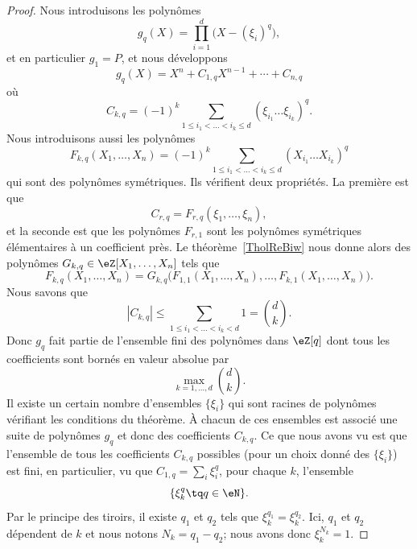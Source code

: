 \begin{proof}
    Nous introduisons les polynômes
    \begin{equation}
        g_q(X)=\prod_{i=1}^d\big( X-(\xi_i)^q \big),
    \end{equation}
    et en particulier \( g_1=P\), et nous développons
    \begin{equation}
        g_q(X)=X^n+C_{1,q}X^{n-1}+\cdots +C_{n,q}
    \end{equation}
    où
    \begin{equation}
        C_{k,q}=(-1)^k\sum_{1\leq i_1<\ldots<i_k\leq d}(\xi_{i_1}\ldots \xi_{i_k})^q.
    \end{equation}
    Nous introduisons aussi les polynômes
    \begin{equation}
        F_{k,q}(X_1,\ldots, X_n)=(-1)^k\sum_{1\leq i_1<\ldots< i_k\leq d}(X_{i_1}\ldots X_{i_k})^q
    \end{equation}
    qui sont des polynômes symétriques. Ils vérifient deux propriétés. La première est que
    \begin{equation}
        C_{r,q}=F_{r,q}(\xi_1,\ldots, \xi_n),
    \end{equation}
    et la seconde est que les polynômes \( F_{r,1}\) sont les polynômes symétriques élémentaires à un coefficient près. Le théorème~\ref{TholReBiw} nous donne alors des polynômes \( G_{k,q}\in \eZ[X_1,\ldots, X_n]\) tels que
    \begin{equation}
        F_{k,q}(X_1,\ldots, X_n)=G_{k,q}\big( F_{1,1}(X_1,\ldots, X_n),\ldots, F_{k,1}(X_1,\ldots, X_n) \big).
    \end{equation}
    Nous savons que
    \begin{equation}
        | C_{k,q} |\leq \sum_{1\leq i_1<\ldots<i_k<d}1={d\choose k}.
    \end{equation}
    Donc \( g_q\) fait partie de l'ensemble fini des polynômes dans \( \eZ[q]\) dont tous les coefficients sont bornés en valeur absolue par
    \begin{equation}
        \max_{k=1,\ldots, d}{d\choose k}.
    \end{equation}
    Il existe un certain nombre d'ensembles \( \{ \xi_i \}\) qui sont racines de polynômes vérifiant les conditions du théorème. À chacun de ces ensembles est associé une suite de polynômes \( g_q\) et donc des coefficients \( C_{k,q}\). Ce que nous avons vu est que l'ensemble de tous les coefficients \( C_{k,q}\) possibles (pour un choix donné des \( \{ \xi_i \}\)) est fini, en particulier, vu que \( C_{1,q}=\sum_i\xi_i^q\), pour chaque \( k\), l'ensemble
    \begin{equation}
        \{ \xi_k^q\tq q\in \eN \}.
    \end{equation}
    Par le principe des tiroirs, il existe \( q_1\) et \( q_2\) tels que \( \xi_k^{q_1}=\xi_k^{q_2}\). Ici, \( q_1\) et \( q_2\) dépendent de \( k\) et nous notons \( N_k=q_1-q_2\); nous avons donc \( \xi_k^{N_k}=1\).


\end{proof}
